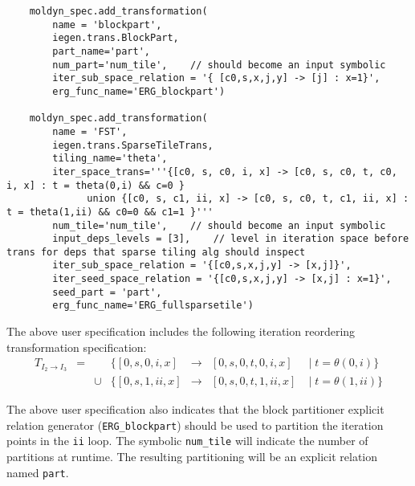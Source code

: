 \documentclass{article}
\begin{document}
\begin{verbatim}
    moldyn_spec.add_transformation(
        name = 'blockpart',
        iegen.trans.BlockPart,
        part_name='part',
        num_part='num_tile',    // should become an input symbolic
        iter_sub_space_relation = '{ [c0,s,x,j,y] -> [j] : x=1}',
        erg_func_name='ERG_blockpart')  

    moldyn_spec.add_transformation(
        name = 'FST',
        iegen.trans.SparseTileTrans,
        tiling_name='theta',
        iter_space_trans='''{[c0, s, c0, i, x] -> [c0, s, c0, t, c0, i, x] : t = theta(0,i) && c=0 }
              union {[c0, s, c1, ii, x] -> [c0, s, c0, t, c1, ii, x] : t = theta(1,ii) && c0=0 && c1=1 }'''
        num_tile='num_tile',    // should become an input symbolic
        input_deps_levels = [3],    // level in iteration space before trans for deps that sparse tiling alg should inspect
        iter_sub_space_relation = '{[c0,s,x,j,y] -> [x,j]}',
        iter_seed_space_relation = '{[c0,s,x,j,y] -> [x,j] : x=1}',
        seed_part = 'part',
        erg_func_name='ERG_fullsparsetile')  
\end{verbatim}
 
The above user specification includes the following iteration reordering transformation specification:
\[
\begin{array}{rcclcll}
	T_{I_2 \rightarrow I_3} & = & &\{ [0, s, 0, i, x ] & \rightarrow & [ 0, s, 0, t, 0, i, x] \; & | \; t = \theta( 0, i ) \} \\
		& & \cup & \{ [0, s, 1, ii, x ] & \rightarrow & [ 0, s, 0, t, 1, ii, x] \; & | \; t = \theta( 1, ii ) \} 
\end{array}
\]

The above user specification also indicates that the block partitioner explicit relation 
generator ({\tt ERG\_blockpart})
should be used to partition the iteration points in the {\tt ii} loop.  
The symbolic {\tt num\_tile} will indicate the number of partitions at runtime.
The resulting partitioning will be an
explicit relation named {\tt part}.  
\end{document}
